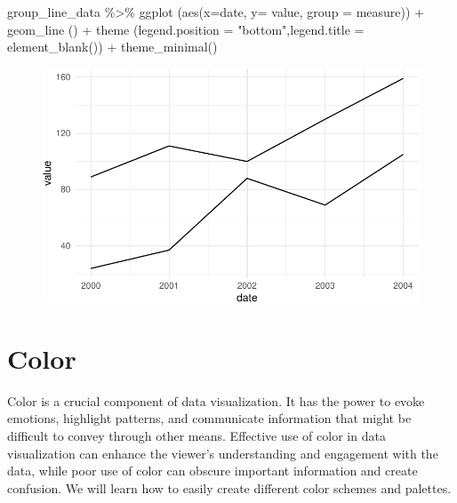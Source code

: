 \documentclass[
  letterpaper,
]{book}
\newenvironment{Shaded}{\begin{snugshade}}{\end{snugshade}}
\newcommand{\AttributeTok}[1]{\textcolor[rgb]{0.40,0.45,0.13}{#1}}
\newcommand{\FunctionTok}[1]{\textcolor[rgb]{0.28,0.35,0.67}{#1}}
\newcommand{\NormalTok}[1]{\textcolor[rgb]{0.00,0.23,0.31}{#1}}
\newcommand{\SpecialCharTok}[1]{\textcolor[rgb]{0.37,0.37,0.37}{#1}}
\newcommand{\StringTok}[1]{\textcolor[rgb]{0.13,0.47,0.30}{#1}}
\begin{document}
\begin{Shaded}
\begin{Highlighting}[]
\NormalTok{group\_line\_data }\SpecialCharTok{\%\textgreater{}\%} \FunctionTok{ggplot}\NormalTok{ (}\FunctionTok{aes}\NormalTok{(}\AttributeTok{x=}\NormalTok{date, }\AttributeTok{y=}\NormalTok{ value, }\AttributeTok{group =}\NormalTok{ measure)) }\SpecialCharTok{+} \FunctionTok{geom\_line}\NormalTok{ () }\SpecialCharTok{+} \FunctionTok{theme}\NormalTok{ (}\AttributeTok{legend.position =} \StringTok{"bottom"}\NormalTok{,}\AttributeTok{legend.title =} \FunctionTok{element\_blank}\NormalTok{()) }\SpecialCharTok{+} \FunctionTok{theme\_minimal}\NormalTok{()}
\end{Highlighting}
\end{Shaded}

\begin{figure}[H]

{\centering \includegraphics{./data_viz_files/figure-pdf/unnamed-chunk-20-2.pdf}

}

\end{figure}

\hypertarget{color}{%
\chapter{Color}\label{color}}

Color is a crucial component of data visualization. It has the power to
evoke emotions, highlight patterns, and communicate information that
might be difficult to convey through other means. Effective use of color
in data visualization can enhance the viewer's understanding and
engagement with the data, while poor use of color can obscure important
information and create confusion. We will learn how to easily create
different color schemes and palettes.
\end{document}
